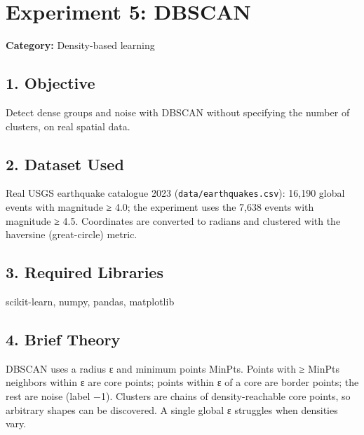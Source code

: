 
\chapter{Experiment 5: DBSCAN}\label{experiment-5-dbscan}

\textbf{Category:} Density-based learning

\section{1. Objective}\label{objective}

Detect dense groups and noise with DBSCAN without specifying the number
of clusters, on real spatial data.

\section{2. Dataset Used}\label{dataset-used}

Real USGS earthquake catalogue 2023
(\passthrough{\lstinline!data/earthquakes.csv!}): 16,190 global events
with magnitude ≥ 4.0; the experiment uses the 7,638 events with
magnitude ≥ 4.5. Coordinates are converted to radians and clustered with
the haversine (great-circle) metric.

\section{3. Required Libraries}\label{required-libraries}

scikit-learn, numpy, pandas, matplotlib

\section{4. Brief Theory}\label{brief-theory}

DBSCAN uses a radius ε and minimum points MinPts. Points with ≥ MinPts
neighbors within ε are core points; points within ε of a core are border
points; the rest are noise (label −1). Clusters are chains of
density-reachable core points, so arbitrary shapes can be discovered. A
single global ε struggles when densities vary.

